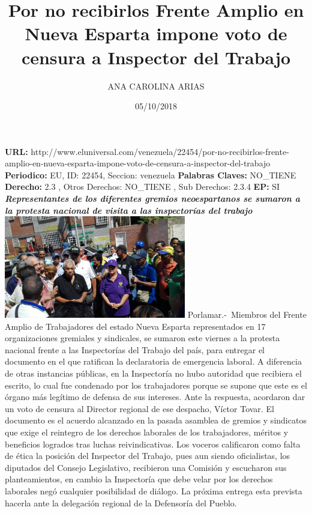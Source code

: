 \documentclass{article}%
\title{\textbf{Por no recibirlos Frente Amplio en Nueva Esparta impone voto de censura a Inspector del Trabajo}}%
\author{ANA CAROLINA ARIAS}%
\date{05/10/2018}%
\begin{document}
%
\normalsize%
\maketitle%
\textbf{URL: }%
http://www.eluniversal.com/venezuela/22454/por{-}no{-}recibirlos{-}frente{-}amplio{-}en{-}nueva{-}esparta{-}impone{-}voto{-}de{-}censura{-}a{-}inspector{-}del{-}trabajo\newline%
%
\textbf{Periodico: }%
EU, %
ID: %
22454, %
Seccion: %
venezuela\newline%
%
\textbf{Palabras Claves: }%
NO\_TIENE\newline%
%
\textbf{Derecho: }%
2.3%
, Otros Derechos: %
NO\_TIENE%
, Sub Derechos: %
2.3.4%
\newline%
%
\textbf{EP: }%
SI\newline%
\newline%
%
\textbf{\textit{Representantes de los diferentes gremios neoespartanos se sumaron a la protesta nacional de visita a las inspectorías del trabajo}}%
\newline%
\newline%
%
\includegraphics[width=300px]{91.jpg}%
\newline%
%
Porlamar.{-}~Miembros del Frente Amplio de Trabajadores del estado Nueva Esparta representados en 17 organizaciones gremiales y sindicales, se sumaron este viernes a la protesta nacional frente a las Inspectorías del Trabajo del país, para entregar el documento en el que ratifican la declaratoria de emergencia laboral.%
\newline%
%
A diferencia de otras instancias públicas, en la Inspectoría no hubo autoridad que recibiera el escrito, lo cual fue condenado por los trabajadores porque se supone que este es el órgano  más legítimo de defensa de sus intereses.%
\newline%
%
Ante la respuesta, acordaron dar un voto de censura al Director regional de ese despacho, Víctor Tovar.%
\newline%
%
El documento es el acuerdo alcanzado en la pasada asamblea de gremios y sindicatos que exige el reintegro de los derechos laborales de los trabajadores, méritos y beneficios logrados tras luchas reivindicativas.%
\newline%
%
Los voceros calificaron como falta de ética la posición del Inspector del Trabajo, pues aun siendo oficialistas, los diputados del Consejo Legislativo, recibieron una Comisión y escucharon sus planteamientos, en cambio la Inspectoría que debe velar por los derechos laborales negó cualquier posibilidad de diálogo.%
\newline%
%
La próxima entrega esta prevista hacerla ante la delegación regional de la Defensoría del Pueblo.%
\newline%
%
\end{document}
